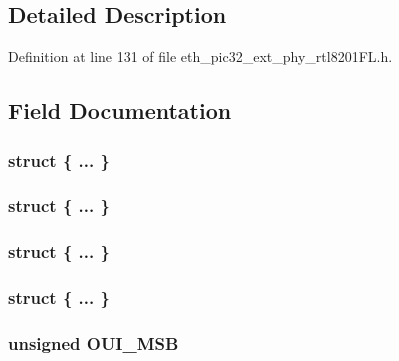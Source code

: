 \subsection{Detailed Description}


Definition at line 131 of file eth\+\_\+pic32\+\_\+ext\+\_\+phy\+\_\+rtl8201\+F\+L.\+h.



\subsection{Field Documentation}
\hypertarget{union_____p_h_y_i_d1bits__t_a43baafe7cc964ef79303a950f891106a}{}\subsubsection[{"@108}]{\setlength{\rightskip}{0pt plus 5cm}struct \{ ... \} }\label{union_____p_h_y_i_d1bits__t_a43baafe7cc964ef79303a950f891106a}
\hypertarget{union_____p_h_y_i_d1bits__t_ae97a394b46a20c4d584211058b1b6d3b}{}\subsubsection[{"@110}]{\setlength{\rightskip}{0pt plus 5cm}struct \{ ... \} }\label{union_____p_h_y_i_d1bits__t_ae97a394b46a20c4d584211058b1b6d3b}
\hypertarget{union_____p_h_y_i_d1bits__t_a3e90a1bf33a638a71b47c7509c4a5a90}{}\subsubsection[{"@180}]{\setlength{\rightskip}{0pt plus 5cm}struct \{ ... \} }\label{union_____p_h_y_i_d1bits__t_a3e90a1bf33a638a71b47c7509c4a5a90}
\hypertarget{union_____p_h_y_i_d1bits__t_aa7c4b0bb948dbb8e2c2d344859d2cc32}{}\subsubsection[{"@182}]{\setlength{\rightskip}{0pt plus 5cm}struct \{ ... \} }\label{union_____p_h_y_i_d1bits__t_aa7c4b0bb948dbb8e2c2d344859d2cc32}
\hypertarget{union_____p_h_y_i_d1bits__t_ad8f0977764da80bdd20b1819a5c11036}{}
\subsubsection[{O\+U\+I\+\_\+\+M\+S\+B}]{\setlength{\rightskip}{0pt plus 5cm}unsigned O\+U\+I\+\_\+\+M\+S\+B}\label{union_____p_h_y_i_d1bits__t_ad8f0977764da80bdd20b1819a5c11036}


